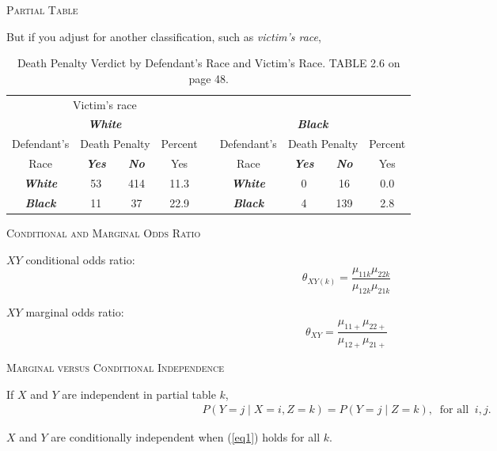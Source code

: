 \documentclass[dvipdfmx, serif,handout]{beamer}
\begin{document}
\begin{frame}{\textsc{Partial Table}}

\bi
\item But if you adjust for another classification, such as {\em victim's race},
\vspace{.5cm}
{\scriptsize
\begin{table} 
{\tabcolsep=0.03in
\begin{tabular}{ccccccccc} \hline
\multicolumn{4}{c}{{Victim's race}} \\
\multicolumn{4}{c}{\bf{\em White}} & & \multicolumn{4}{c}{\bf{\em Black}} \\ \cline{1-4} \cline{6-9} 
Defendant's & \multicolumn{2}{c}{Death Penalty} & Percent & & Defendant's &
\multicolumn{2}{c}{Death Penalty} & Percent \\ \cline{2-3} \cline{7-8}   
{Race} & {\bf{\em Yes}} & {\bf{\em No}} & Yes & & {Race} & {\bf{\em Yes}} & {\bf{\em No}} & Yes \\ \cline{1-4} \cline{6-9} 
{\bf{\em White}} & 53 & 414 & 11.3 & & {\bf{\em White}} & 0 & 16 & 0.0 \\
{\bf{\em Black}} & 11 & 37 & 22.9 & & {\bf{\em Black}} & 4 & 139 & 2.8 \\ \hline
\end{tabular}
\caption{\scriptsize Death Penalty Verdict by Defendant's Race and Victim's Race. TABLE 2.6 on page 48.}
}
\end{table}
}
\ei

\end{frame}
\begin{frame}{\textsc{Conditional and Marginal Odds Ratio}}

\bi
\item $XY$ conditional odds ratio:
$$\theta_{XY(k)} = \frac{\mu_{11k}\mu_{22k}}{\mu_{12k}\mu_{21k}}$$
\item $XY$ marginal odds ratio:
$$\theta_{XY} = \frac{\mu_{11+}\mu_{22+}}{\mu_{12+}\mu_{21+}}$$
\ei

\end{frame}
\begin{frame}{\textsc{Marginal versus Conditional Independence}}

\bi
\item If $X$ and $Y$ are independent in partial table $k$,
\begin{eqnarray}
P(Y=j \mid X=i, Z=k) = P(Y=j \mid Z=k), \;\; \mbox{for all}\;\; i,j.
\label{eq1}
\end{eqnarray}
\item $X$ and $Y$ are conditionally independent when (\ref{eq1}) holds for all $k$.
\ei

\end{frame}
\end{document}
